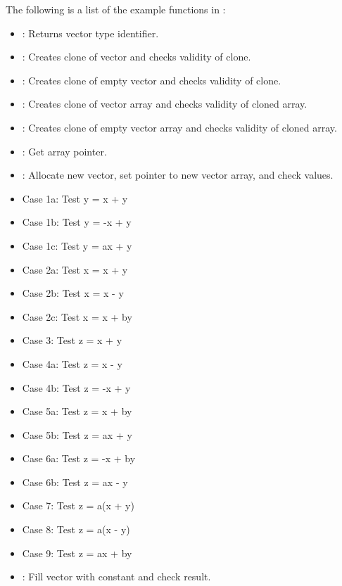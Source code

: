 \noindent The following is a list of the example functions in :
\begin{itemize}
\item {}: Returns vector type identifier.
\item {}: Creates clone of vector and checks validity of clone.  
\item {}: Creates clone of empty vector and checks validity of clone.  
\item {}: Creates clone of vector array and checks validity of cloned array.  
\item {}: Creates clone of empty vector array and checks validity of cloned array.  
\item {}: Get array pointer. 
\item {}: Allocate new vector, set pointer to new vector array, and check values. 
\item {} Case 1a: Test y =  x + y 
\item {} Case 1b: Test y = -x + y 
\item {} Case 1c: Test y = ax + y
\item {} Case 2a: Test x =  x + y
\item {} Case 2b: Test x =  x - y
\item {} Case 2c: Test x =  x + by
\item {} Case 3:  Test z =  x + y
\item {} Case 4a: Test z =  x - y
\item {} Case 4b: Test z = -x + y
\item {} Case 5a: Test z =  x + by
\item {} Case 5b: Test z = ax + y
\item {} Case 6a: Test z = -x + by
\item {} Case 6b: Test z = ax - y
\item {} Case 7:  Test z = a(x + y)
\item {} Case 8:  Test z = a(x - y)
\item {} Case 9:  Test z = ax + by
\item {}: Fill vector with constant and check result.

\end{itemize}
